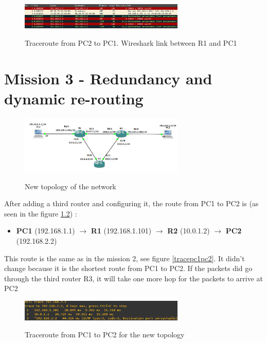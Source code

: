 \documentclass[10pt,a4paper]{ULBreport}
\begin{document}
\begin{figure}[H]
    \caption{Traceroute from PC2 to PC1. Wireshark link between R1 and PC1}
    \center
    \includegraphics[width=0.7\textwidth]{tracerouteR1PC1.png}
    \label{tracerouter1pc1}
\end{figure}


\chapter{Mission 3 - Redundancy and dynamic re-routing}

\begin{figure}[H]
    \caption{New topology of the network}
    \center
    \includegraphics[width=0.7\textwidth]{topologyRRR.png}
    \label{newtopo}
\end{figure}



After adding a third router and configuring it, the route from PC1 to PC2 is (as seen in the figure \ref{tracePC1PC2rrr}) :

\begin{itemize}
    \item \textbf{PC1} (192.168.1.1) $\rightarrow$ \textbf{R1} (192.168.1.101) $\rightarrow$ \textbf{R2} (10.0.1.2) $\rightarrow$ \textbf{PC2} (192.168.2.2)  
\end{itemize}

This route is the same as in the mission 2, see figure \ref{tracepc1pc2}. It didn't change because it is the shortest route from PC1 to PC2. If the packets did go through the third router R3, it will take one more hop for the packets to arrive at PC2

\begin{figure}[H]
    \caption{Traceroute from PC1 to PC2 for the new topology}
    \center
    \includegraphics[width=0.7\textwidth]{tracePC1PC2RRR.png}
    \label{tracePC1PC2rrr}
\end{figure}
\end{document}
